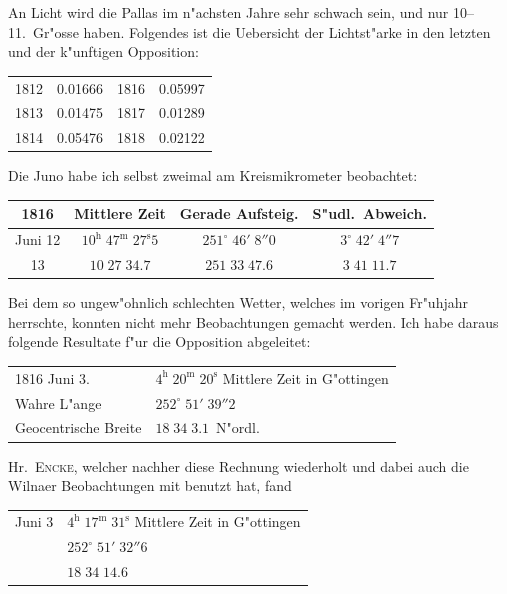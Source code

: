 \documentclass[12pt,a4paper]{article}
\begin{document}
An Licht wird die Pallas im n"achsten Jahre sehr schwach sein, und nur 10--11.~Gr"osse haben.
Folgendes ist die Uebersicht der Lichtst"arke in den letzten und der k"unftigen Opposition:

\begin{center}
\begin{tabular}{c|c|c|c}
1812 & 0.01666 & 1816 & 0.05997 \\
1813 & 0.01475 & 1817 & 0.01289 \\
1814 & 0.05476 & 1818 & 0.02122 \\
\end{tabular}
\end{center}

Die Juno habe ich selbst zweimal am Kreismikrometer beobachtet:

\begin{center}
\begin{tabular}{c|c|c|c}
1816 & Mittlere Zeit & Gerade Aufsteig. & S"udl.~Abweich. \\
\midrule
Juni 12 & $10^{\mathrm{h}}\;47^{\mathrm{m}}\;27^{\mathrm{s}}5$ & $251^{\circ}\;46'\;8''0$ & $3^{\circ}\;42'\;4''7$ \\
\phantom{12} 13 & $10\;27\;34.7$ & $251\;33\;47.6$ & $3\;41\;11.7$ \\
\end{tabular}
\end{center}

Bei dem so ungew"ohnlich schlechten Wetter, welches im vorigen Fr"uhjahr herrschte, konnten nicht mehr
Beobachtungen gemacht werden. Ich habe daraus folgende Resultate f"ur die Opposition abgeleitet:

\begin{center}
\begin{tabular}{l@{\quad}l}
1816 Juni 3. & $4^{\mathrm{h}}\;20^{\mathrm{m}}\;20^{\mathrm{s}}$ Mittlere Zeit in G"ottingen \\
Wahre L"ange \dotfill & $252^{\circ}\;51'\;39''2$ \\
Geocentrische Breite \dotfill & $18\;34\;3.1$~N"ordl.
\end{tabular}
\end{center}

Hr.~\textsc{Encke}, welcher nachher diese Rechnung wiederholt und dabei auch die Wilnaer Beobachtungen
mit benutzt hat, fand

\begin{center}
\begin{tabular}{l@{\quad}l}
Juni 3 & $4^{\mathrm{h}}\;17^{\mathrm{m}}\;31^{\mathrm{s}}$ Mittlere Zeit in G"ottingen \\
& $252^{\circ}\;51'\;32''6$ \\
& $18\;34\;14.6$
\end{tabular}
\end{center}
\end{document}
